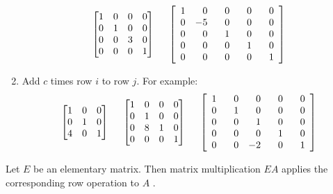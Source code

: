 \begin{definition}
\begin{enumerate}
$$\begin{bmatrix} 1 & 0 & 0 & 0 \\ 0 & 1 & 0 & 0 \\ 0 & 0 & 3 & 0 \\ 0 & 0 & 0 & 1 \end{bmatrix} \hspace{5mm}
\left[ \begin{array}{rrrrr} 1 & \phantom{+}0 & \phantom{+}0 & \phantom{+}0 & \phantom{+}0 \\
0 & -5 & 0 & 0 & 0 \\ 0 & 0 & 1 & 0 & 0 \\ 0 & 0 & 0 & 1 & 0 \\ 0 & 0 & 0 & 0 & 1 \end{array} \right]
$$
\item Add $c$ times row $i$ to row $j$. For example:
$$
\begin{bmatrix} 1 & 0 & 0 \\ 0 & 1 & 0 \\ 4 & 0 & 1 \end{bmatrix} \hspace{5mm}
\begin{bmatrix} 1 & 0 & 0 & 0 \\ 0 & 1 & 0 & 0 \\ 0 & 8 & 1 & 0 \\ 0 & 0 & 0 & 1 \end{bmatrix} \hspace{5mm}
\left[ \begin{array}{rrrrr} 1 & \phantom{+}0 & \phantom{+}0 & \phantom{+}0 & \phantom{+}0 \\
0 & 1 & 0 & 0 & 0 \\ 0 & 0 & 1 & 0 & 0 \\ 0 & 0 & 0 & 1 & 0 \\ 0 & 0 & -2 & 0 & 1 \end{array} \right]
$$
\end{enumerate}
\end{definition}

\begin{proposition}
Let $E$ be an elementary matrix. Then matrix multiplication $EA$ applies the corresponding row operation to $A$ \cite[p.96]{KN}.
\end{proposition}

